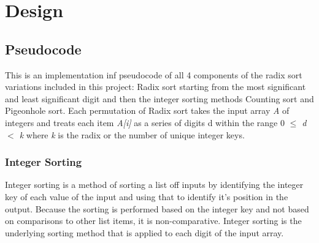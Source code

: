 \documentclass[12pt]{article}
\begin{document}
{
  \hypersetup{linkcolor=black}
  \tableofcontents
}



\pagebreak
\section{Design}
\label{sec:design}
	\subsection{Pseudocode}
	This is an implementation inf pseudocode of all 4 components of the radix sort variations included in this project: Radix sort starting from the most significant and least significant digit and then the integer sorting methods Counting sort and Pigeonhole sort. Each permutation of Radix sort takes the input array \textit{A} of integers and treats each item \textit{A[i]} as a series of digits d within the range 0 \textit{$\leq$ d $<$ k} where \textit{k} is the radix or the number of unique integer keys. 
	\subsubsection{Integer Sorting}
	Integer sorting is a method of sorting a list off inputs by identifying the integer key of each value of the input and using that to identify it's position in the output. Because the sorting is performed based on the integer key and not based on comparisons to other list items, it is non-comparative. Integer sorting is the underlying sorting method that is applied to each digit of the input array.
\end{document}
